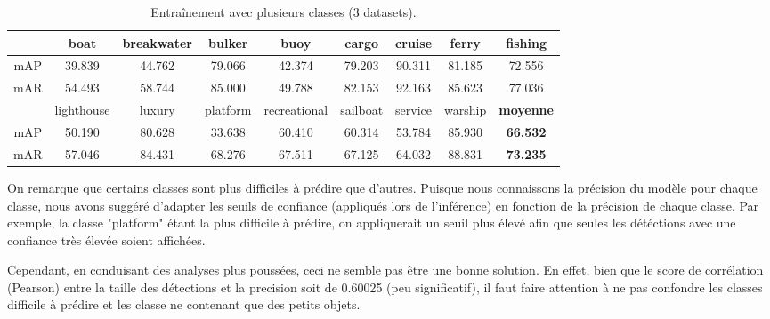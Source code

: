 \begin{table}[H]
    \begin{center}
        \begin{tabular}{c c c c c c c c c}
            \hline
            & boat & breakwater & bulker & buoy & cargo & cruise & ferry & fishing \\
            \hline
            mAP & 39.839 & 44.762 & 79.066 & 42.374 & 79.203 & 90.311 & 81.185 & 72.556 \\
            mAR & 54.493 & 58.744 & 85.000 & 49.788 & 82.153 & 92.163 & 85.623 & 77.036 \\
            \hline
            & lighthouse & luxury & platform & recreational & sailboat & service & warship & \textbf{moyenne} \\
            \hline
            mAP & 50.190 & 80.628 & 33.638 & 60.410 & 60.314 & 53.784 & 85.930 & \textbf{66.532 }\\
            mAR & 57.046 & 84.431 & 68.276 & 67.511 & 67.125 & 64.032 & 88.831 & \textbf{73.235 }\\
        \end{tabular}
    \end{center}
    \caption{Entraînement avec plusieurs classes (3 datasets).}
\end{table}

On remarque que certains classes sont plus difficiles à prédire que d'autres. 
Puisque nous connaissons la précision du modèle pour chaque classe, nous avons suggéré d'adapter les 
seuils de confiance (appliqués lors de l'inférence) en fonction de la précision de chaque classe. 
Par exemple, la classe "platform" étant la plus difficile à prédire, on appliquerait un seuil plus élevé afin 
que seules les détéctions avec une confiance très élevée soient affichées. 

Cependant, en conduisant des analyses plus poussées, ceci ne semble pas être une bonne solution. 
En effet, bien que le score de corrélation  (Pearson) entre la taille des détections et la precision 
soit de 0.60025 (peu significatif), il faut faire attention à ne pas confondre les classes
difficile à prédire et les classe ne contenant que des petits objets. 

